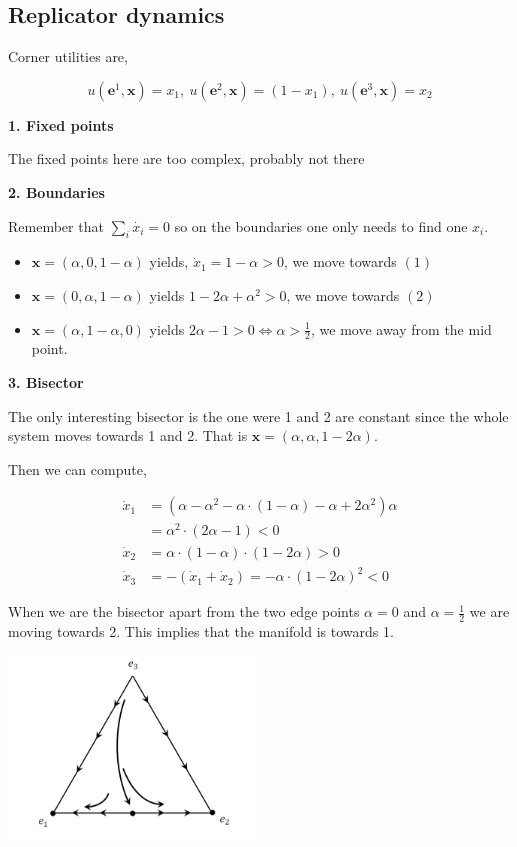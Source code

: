 \documentclass[american]{scrartcl}
\begin{document}
\subsection{Replicator dynamics}

Corner utilities are,

\begin{equation}
    u(\bm{e}^1, \bm{x}) = x_1, \ u(\bm{e}^2, \bm{x}) = (1 - x_1),\ u(\bm{e}^3, \bm{x}) = x_2
\end{equation}

\textbf{1. Fixed points}

The fixed points here are too complex, probably not there

\textbf{2. Boundaries}

Remember that $\sum_i \dot{x_i} = 0$ so on the boundaries one only needs to find one $x_i$.

\begin{itemize}
    \item $\bm{x} = \left( \alpha, 0, 1-\alpha \right)$ yields, $\dot{x}_1 = 1 - \alpha > 0$, we move towards $(1)$
    \item $\bm{x} = \left( 0, \alpha, 1-\alpha \right)$ yields $1 - 2\alpha + \alpha^2 > 0$, we move towards $(2)$
    \item $\bm{x} = \left( \alpha, 1-\alpha, 0 \right)$ yields $2 \alpha - 1 > 0 \iff \alpha > \frac{1}{2}$, we move away from the mid point.
\end{itemize}

\textbf{3. Bisector}

The only interesting bisector is the one were 1 and 2 are constant since the whole system moves towards 1 and 2. That is $\bm{x} = (\alpha, \alpha, 1 - 2\alpha)$.

Then we can compute,

\begin{equation}
    \begin{split}
        \dot{x}_1 &= \left( \alpha - \alpha^2 - \alpha \cdot (1 - \alpha) - \alpha + 2\alpha^2 \right) \alpha \\
        &= \alpha^2 \cdot (2 \alpha - 1) < 0 \\
        \dot{x}_2 &= \alpha \cdot (1 - \alpha) \cdot (1 - 2\alpha) > 0 \\
        \dot{x}_3 &= - (\dot{x}_1 + \dot{x}_2) = -\alpha \cdot (1 - 2\alpha)^2 < 0
    \end{split}
\end{equation}

When we are the bisector apart from the two edge points $\alpha = 0$ and $\alpha = \frac{1}{2}$ we are moving towards 2. This implies that the manifold is towards 1.

\begin{center}
    \includegraphics[width=0.5\textwidth]{images/weibull_14.PNG}
\end{center}
\end{document}
